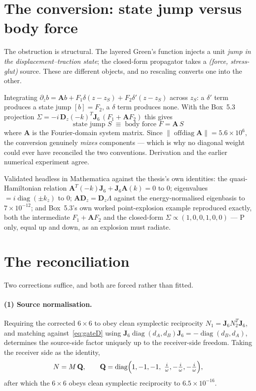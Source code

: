 \documentclass[11pt,a4paper]{article}
\newcommand{\bJ}{\mathbf{J}}
\newcommand{\bA}{\mathbf{A}}
\newcommand{\bQ}{\mathbf{Q}}
\newcommand{\bD}{\mathbf{D}}
\begin{document}
\section{The conversion: state jump versus body force}

The obstruction is structural.  The layered Green's function injects a unit
\emph{jump in the displacement--traction state}; the closed-form propagator
takes a \emph{(force, stress-glut)} source.  These are different objects, and
no rescaling converts one into the other.

Integrating $\partial_z b = \bA b + F_1\delta(z-z_S) + F_2\delta'(z-z_S)$
across $z_S$: a $\delta'$ term produces a state jump $[b] = F_2$, a $\delta$
term produces none.  With the Box~5.3 projection
$\Sigma = -i\,\bD_z(-k)^{T}\bJ_6\,(F_1 + \bA F_2)$ this gives
\begin{equation}\label{eq:conversion}
  \boxed{\;\text{state jump } S \;\equiv\; \text{body force } F = \bA\,S\;}
\end{equation}
where $\bA$ is the Fourier-domain system matrix.  Since
$\lVert\operatorname{offdiag}\bA\rVert = 5.6\times10^{6}$, the conversion
genuinely \emph{mixes} components --- which is why no diagonal weight could
ever have reconciled the two conventions.  Derivation and the earlier numerical
experiment agree.

Validated headless in Mathematica against the thesis's own identities: the
quasi-Hamiltonian relation $\bA^{T}(-k)\bJ_6 + \bJ_6\bA(k) = 0$ to $0$;
eigenvalues $= i\operatorname{diag}(\pm k_z)$ to $0$; $\bA\bD_z = \bD_z\Lambda$
against the energy-normalised eigenbasis to $7\times10^{-12}$; and Box~5.3's
own worked point-explosion example reproduced exactly, both the intermediate
$F_1 + \bA F_2$ and the closed-form $\Sigma \propto (1,0,0,1,0,0)$ --- P only,
equal up and down, as an explosion must radiate.

\section{The reconciliation}

Two corrections suffice, and both are forced rather than fitted.

\paragraph{(1) Source normalisation.}  Requiring the corrected $6\times6$ to
obey clean symplectic reciprocity $N_1 = \bJ_6 N_2^{T}\bJ_6$, and matching
against~\eqref{eq:gateD} using
$\bJ_6\operatorname{diag}(d_A,d_B)\bJ_6 = -\operatorname{diag}(d_B,d_A)$,
determines the source-side factor uniquely up to the receiver-side freedom.
Taking the receiver side as the identity,
\begin{equation}\label{eq:Q}
  N = M\,\bQ,\qquad
  \bQ = \operatorname{diag}\Bigl(1,-1,-1,\ \tfrac{i}{\omega},
        -\tfrac{i}{\omega},-\tfrac{i}{\omega}\Bigr),
\end{equation}
after which the $6\times6$ obeys clean symplectic reciprocity to
$6.5\times10^{-16}$.
\end{document}

